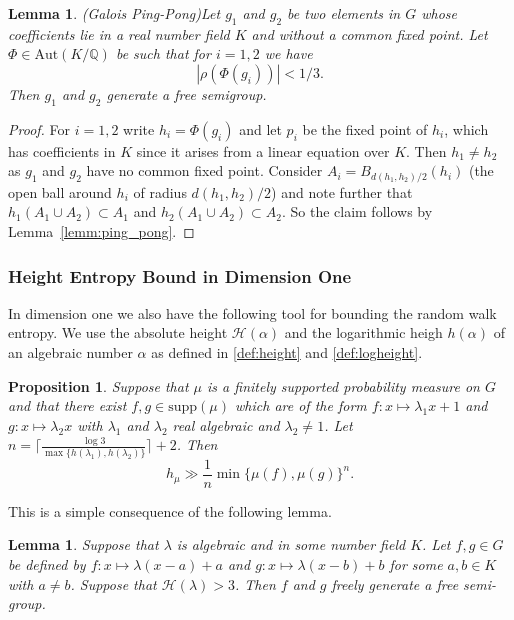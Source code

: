 \documentclass[10pt, english,oneside,reqno]{amsart}
\theoremstyle{plain}
\newtheorem{proposition}[theorem]{Proposition}
\newtheorem{lemma}[theorem]{Lemma}
\theoremstyle{remark}
\numberwithin{equation}{section}
\numberwithin{figure}{section}
\newcommand{\Q}{\mathbb{Q}}
\newcommand{\supp}[1]{\mathrm{supp}(#1)}
\begin{document}
\begin{lemma}(Galois Ping-Pong)\label{lemm:GaloisPingPong}
    Let $g_1$ and $g_2$ be two elements in $G$ whose coefficients lie in a real number field $K$ and without a common fixed point. Let $\Phi \in \mathrm{Aut}(K/\Q)$ be such that for $i = 1,2$ we have $$|\rho(\Phi(g_i))| < 1/3.$$ Then $g_1$ and $g_2$ generate a free semigroup.
\end{lemma}

\begin{proof}
    For $i = 1,2$ write $h_i = \Phi(g_i)$ and let $p_i$ be the fixed point of $h_i$, which has coefficients in $K$ since it arises from a linear equation over $K$. Then $h_1 \neq h_2$ as $g_1$ and $g_2$ have no common fixed point. Consider $A_i = B_{d(h_1,h_2)/2}(h_i)$ (the open ball around $h_i$ of radius $d(h_1,h_2)/2$) and note further that $h_1(A_1 \cup A_2)\subset A_1$ and $h_2(A_1 \cup A_2)\subset A_2$. So the claim follows by Lemma~\ref{lemm:ping_pong}. 
\end{proof}



\subsubsection{Height Entropy Bound in Dimension One}

In dimension one we also have the following tool for bounding the random walk entropy. We use the absolute height $\mathcal{H}(\alpha)$ and the logarithmic heigh $h(\alpha)$ of an algebraic number $\alpha$ as defined in \eqref{def:height} and \eqref{def:logheight}.

\begin{proposition} \label{proposition:height_to_entropy}
    Suppose that $\mu$ is a finitely supported probability measure on $G$ and that there exist $f, g \in \supp \mu$ which are of the form $f: x \mapsto \lambda_1x + 1$ and $g : x \mapsto \lambda_2 x$ with $\lambda_1$ and $\lambda_2$ real algebraic and $\lambda_2 \neq 1$. Let $n =  \lceil\frac{\log 3}{\max \{ h(\lambda_1), h(\lambda_2) \}}\rceil + 2$. Then
    \begin{equation*}
        h_{\mu} \gg \frac{1}{n} \min \{ \mu(f), \mu(g) \}^n.
    \end{equation*}
\end{proposition}

This is a simple consequence of the following lemma.

\begin{lemma} \label{lemma:height_to_free_semigroup}
    Suppose that $\lambda$ is algebraic and in some number field $K$. Let $f, g \in G$ be defined by $f : x \mapsto \lambda(x - a) + a$ and $g : x \mapsto \lambda(x - b) + b$ for some $a, b \in K$ with $a \neq b$. Suppose that $\mathcal{H}(\lambda) > 3$. Then $f$ and $g$ freely generate a free semi-group.
\end{lemma}
\end{document}
